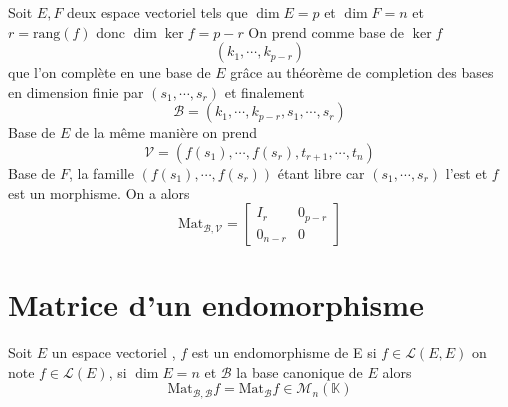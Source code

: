 \documentclass[11pt,colorlinks]{book}
\theoremstyle{mytheoremstyle}
\theoremstyle{mytheoremstyle}
\theoremstyle{mytheoremstyle}
\theoremstyle{mytheoremstyle}
\theoremstyle{mytheoremstyle}
\theoremstyle{mytheoremstyle}
\theoremstyle{mytheoremstyle}
\theoremstyle{mytheoremstyle}
\theoremstyle{myproblemstyle}
\def\mbb#1{\mathbb{#1}}
\def\mfc#1{\mathcal{#1}}
\def\bK{\mbb{K}}
\def\ev{espace vectoriel }
\def\endo{\mfc{L}(E)}
\begin{document}
\begin{ex}
  Soit $E,F$ deux \ev tels que $\dim E = p$ et $\dim F = n$ et $r = \text{rang}(f)$ donc $\dim \ker f = p - r$ 
  On prend comme base de $\ker f$
  \begin{equation*}
    (k_1,\cdots,k_{p-r}) 
  \end{equation*}
  que l'on complète en une base de $E$ grâce au théorème de completion des bases en dimension finie par $(s_1,\cdots,s_r)$ et finalement 
  \begin{equation*}
    \mfc{B} = (k_1,\cdots,k_{p-r},s_1,\cdots,s_r)
  \end{equation*}
  Base de $E$
  de la même manière on prend
  \begin{equation*}
    \mfc{V} = (f(s_1),\cdots,f(s_r),t_{r+1},\cdots,t_{n})
  \end{equation*}
  Base de $F$, la famille $(f(s_1),\cdots,f(s_r))$ étant libre car $(s_1,\cdots,s_r)$ l'est et $f$ est un morphisme. On a alors 
  \begin{equation*}
    \text{Mat}_{\mfc{B},\mfc{V}} = \begin{bmatrix}
      I_r & 0_{p-r} \\ 
      0_{n-r} & 0
    \end{bmatrix}
  \end{equation*}
\end{ex}
\section{Matrice d'un endomorphisme}
\begin{definition}
  Soit $E$ un \ev, $f$ est un endomorphisme de E si $f \in \mfc{L}(E,E)$ on note $f \in \endo$, si $\dim E = n$
  et $\mfc{B}$ la base canonique de $E$ alors 
  \begin{equation*}
    \text{Mat}_{\mfc{B},\mfc{B}} f = \text{Mat}_{\mfc{B}} f \in \mfc{M}_{n}(\bK)
  \end{equation*}
\end{definition}
\end{document}
